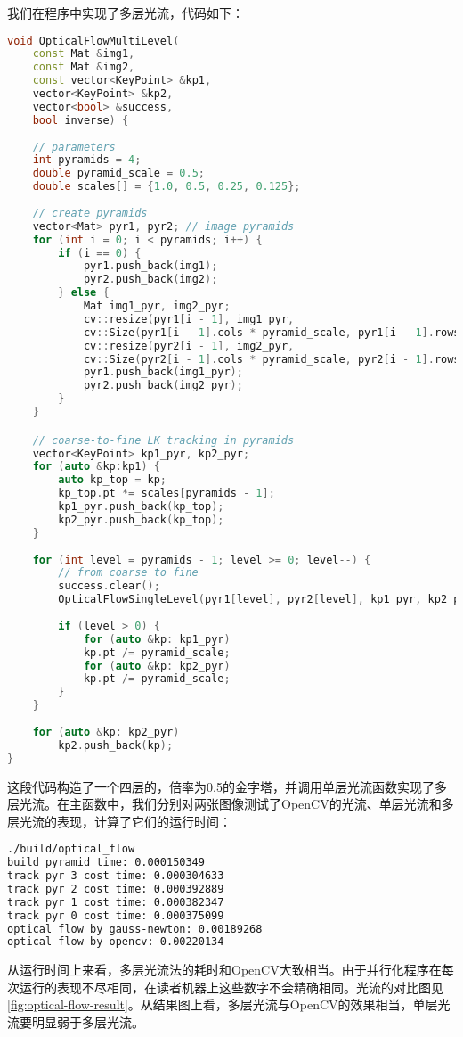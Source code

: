 我们在程序中实现了多层光流，代码如下：
\begin{lstlisting}[language=c++,caption=slambook2/ch8/optical_flow.cpp（片段）]
void OpticalFlowMultiLevel(
	const Mat &img1,
	const Mat &img2,
	const vector<KeyPoint> &kp1,
	vector<KeyPoint> &kp2,
	vector<bool> &success,
	bool inverse) {
	
	// parameters
	int pyramids = 4;
	double pyramid_scale = 0.5;
	double scales[] = {1.0, 0.5, 0.25, 0.125};
	
	// create pyramids
	vector<Mat> pyr1, pyr2; // image pyramids
	for (int i = 0; i < pyramids; i++) {
		if (i == 0) {
			pyr1.push_back(img1);
			pyr2.push_back(img2);
		} else {
			Mat img1_pyr, img2_pyr;
			cv::resize(pyr1[i - 1], img1_pyr,
			cv::Size(pyr1[i - 1].cols * pyramid_scale, pyr1[i - 1].rows * pyramid_scale));
			cv::resize(pyr2[i - 1], img2_pyr,
			cv::Size(pyr2[i - 1].cols * pyramid_scale, pyr2[i - 1].rows * pyramid_scale));
			pyr1.push_back(img1_pyr);
			pyr2.push_back(img2_pyr);
		}
	}

	// coarse-to-fine LK tracking in pyramids
	vector<KeyPoint> kp1_pyr, kp2_pyr;
	for (auto &kp:kp1) {
		auto kp_top = kp;
		kp_top.pt *= scales[pyramids - 1];
		kp1_pyr.push_back(kp_top);
		kp2_pyr.push_back(kp_top);
	}
	
	for (int level = pyramids - 1; level >= 0; level--) {
		// from coarse to fine
		success.clear();
		OpticalFlowSingleLevel(pyr1[level], pyr2[level], kp1_pyr, kp2_pyr, success, inverse, true);
		
		if (level > 0) {
			for (auto &kp: kp1_pyr)
			kp.pt /= pyramid_scale;
			for (auto &kp: kp2_pyr)
			kp.pt /= pyramid_scale;
		}
	}
	
	for (auto &kp: kp2_pyr)
		kp2.push_back(kp);
}
\end{lstlisting}

这段代码构造了一个四层的，倍率为0.5的金字塔，并调用单层光流函数实现了多层光流。在主函数中，我们分别对两张图像测试了OpenCV的光流、单层光流和多层光流的表现，计算了它们的运行时间：
\begin{lstlisting}[language=sh,caption=终端输入：]
./build/optical_flow
build pyramid time: 0.000150349
track pyr 3 cost time: 0.000304633
track pyr 2 cost time: 0.000392889
track pyr 1 cost time: 0.000382347
track pyr 0 cost time: 0.000375099
optical flow by gauss-newton: 0.00189268
optical flow by opencv: 0.00220134
\end{lstlisting}
从运行时间上来看，多层光流法的耗时和OpenCV大致相当。由于并行化程序在每次运行的表现不尽相同，在读者机器上这些数字不会精确相同。光流的对比图见\autoref{fig:optical-flow-result}。从结果图上看，多层光流与OpenCV的效果相当，单层光流要明显弱于多层光流。

